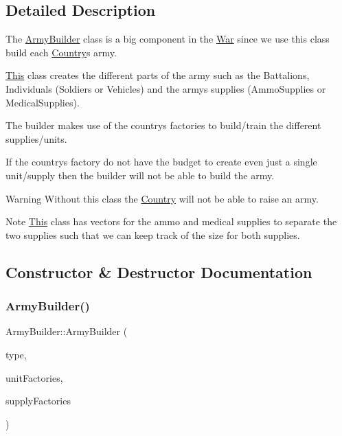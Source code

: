 \subsection{Detailed Description}
The \mbox{\hyperlink{class_army_builder}{Army\+Builder}} class is a big component in the \mbox{\hyperlink{class_war}{War}} since we use this class build each \mbox{\hyperlink{class_country}{Country}}\textquotesingle{}s army.
\begin{DoxyItemize}
\item \mbox{\hyperlink{class_this}{This}} class creates the different parts of the army such as the Battalions, Individuals (Soldiers or Vehicles) and the army\textquotesingle{}s supplies (Ammo\+Supplies or Medical\+Supplies).
\item The builder makes use of the country\textquotesingle{}s factories to build/train the different supplies/units.
\item If the country\textquotesingle{}s factory do not have the budget to create even just a single unit/supply then the builder will not be able to build the army. \begin{DoxyWarning}{Warning}
Without this class the \mbox{\hyperlink{class_country}{Country}} will not be able to raise an army. 
\end{DoxyWarning}
\begin{DoxyNote}{Note}
\mbox{\hyperlink{class_this}{This}} class has vectors for the ammo and medical supplies to separate the two supplies such that we can keep track of the size for both supplies. 
\end{DoxyNote}

\end{DoxyItemize}

\subsection{Constructor \& Destructor Documentation}
\mbox{\label{class_army_builder_aa9f5c5cd78a653da928f234e0b93f677}} 
\subsubsection{\texorpdfstring{ArmyBuilder()}{ArmyBuilder()}}
{\footnotesize\ttfamily Army\+Builder\+::\+Army\+Builder (\begin{DoxyParamCaption}\item[{std\+::string}]{type,  }\item[{std\+::vector$<$ \mbox{\hyperlink{class_unit_factory}{Unit\+Factory}} $\ast$ $>$ $\ast$}]{unit\+Factories,  }\item[{std\+::vector$<$ \mbox{\hyperlink{class_supply_factory}{Supply\+Factory}} $\ast$ $>$ $\ast$}]{supply\+Factories }\end{DoxyParamCaption})}



